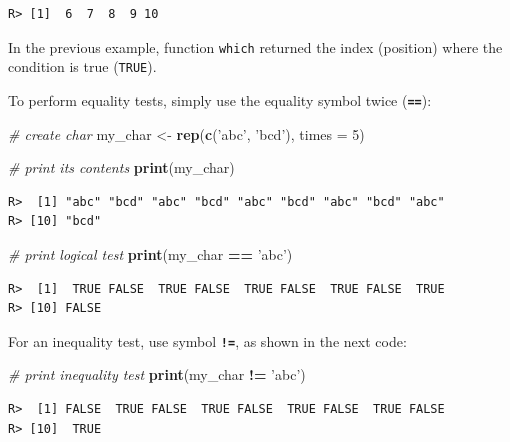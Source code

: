 \documentclass[
  12pt,
]{book}
\newenvironment{Shaded}{\begin{snugshade}}{\end{snugshade}}
\newcommand{\CommentTok}[1]{\textcolor[rgb]{0.37,0.37,0.37}{\textit{#1}}}
\newcommand{\DataTypeTok}[1]{\textcolor[rgb]{0.27,0.27,0.27}{#1}}
\newcommand{\DecValTok}[1]{\textcolor[rgb]{0.06,0.06,0.06}{#1}}
\newcommand{\KeywordTok}[1]{\textcolor[rgb]{0.27,0.27,0.27}{\textbf{#1}}}
\newcommand{\NormalTok}[1]{#1}
\newcommand{\OperatorTok}[1]{\textcolor[rgb]{0.43,0.43,0.43}{\textbf{#1}}}
\newcommand{\StringTok}[1]{\textcolor[rgb]{0.5,0.5,0.5}{#1}}
\begin{document}
\begin{verbatim}
R> [1]  6  7  8  9 10
\end{verbatim}

In the previous example, function \texttt{which} returned the index (position) where the condition is true (\texttt{TRUE}). 

To perform equality tests, simply use the equality symbol twice (\textbf{\texttt{==}}): 

\begin{Shaded}
\begin{Highlighting}[]
\CommentTok{# create char}
\NormalTok{my_char <-}\StringTok{ }\KeywordTok{rep}\NormalTok{(}\KeywordTok{c}\NormalTok{(}\StringTok{'abc'}\NormalTok{, }\StringTok{'bcd'}\NormalTok{), }
               \DataTypeTok{times =} \DecValTok{5}\NormalTok{)}

\CommentTok{# print its contents}
\KeywordTok{print}\NormalTok{(my_char)}
\end{Highlighting}
\end{Shaded}

\begin{verbatim}
R>  [1] "abc" "bcd" "abc" "bcd" "abc" "bcd" "abc" "bcd" "abc"
R> [10] "bcd"
\end{verbatim}

\begin{Shaded}
\begin{Highlighting}[]
\CommentTok{# print logical test}
\KeywordTok{print}\NormalTok{(my_char }\OperatorTok{==}\StringTok{ 'abc'}\NormalTok{)}
\end{Highlighting}
\end{Shaded}

\begin{verbatim}
R>  [1]  TRUE FALSE  TRUE FALSE  TRUE FALSE  TRUE FALSE  TRUE
R> [10] FALSE
\end{verbatim}

For an inequality test, use symbol \textbf{\texttt{!=}}, as shown in the next code: 

\begin{Shaded}
\begin{Highlighting}[]
\CommentTok{# print inequality test}
\KeywordTok{print}\NormalTok{(my_char }\OperatorTok{!=}\StringTok{ 'abc'}\NormalTok{)}
\end{Highlighting}
\end{Shaded}

\begin{verbatim}
R>  [1] FALSE  TRUE FALSE  TRUE FALSE  TRUE FALSE  TRUE FALSE
R> [10]  TRUE
\end{verbatim}
\end{document}
